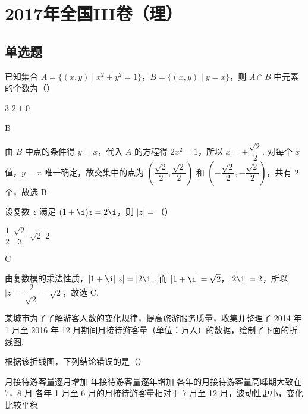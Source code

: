 \chapter{2017年全国III卷（理）}

\section{单选题}

\begin{problem}
已知集合 \(A=\{(x,y)\mid x^2+y^2=1\}\)，\(B=\{(x,y)\mid y=x\}\)，则 \(A\cap B\) 中元素的个数为（\quad）

\choices
    {\(3\)}
    {\(2\)}
    {\(1\)}
    {\(0\)}
\end{problem}

\begin{answer}
B
\end{answer}

\begin{solution}
由 \(B\) 中点的条件得 \(y=x\)，代入 \(A\) 的方程得 \(2x^2=1\)，所以 \(x=\pm\dfrac{\sqrt2}{2}\). 对每个 \(x\) 值，\(y=x\) 唯一确定，故交集中的点为 \(\left(\dfrac{\sqrt2}{2},\dfrac{\sqrt2}{2}\right)\) 和 \(\left(-\dfrac{\sqrt2}{2},-\dfrac{\sqrt2}{2}\right)\)，共有 \(2\) 个，故选 B.
\end{solution}

\begin{problem}
设复数 \(z\) 满足 \((1+\i)z=2\i\)，则 \(\lvert z\rvert=\)（\quad）

\choices
    {\(\dfrac{1}{2}\)}
    {\(\dfrac{\sqrt2}{3}\)}
    {\(\sqrt2\)}
    {\(2\)}
\end{problem}

\begin{answer}
C
\end{answer}

\begin{solution}
由复数模的乘法性质，\(\lvert 1+\i\rvert\lvert z\rvert=\lvert 2\i\rvert\). 而 \(\lvert 1+\i\rvert=\sqrt2\)，\(\lvert 2\i\rvert=2\)，所以 \(\lvert z\rvert=\dfrac{2}{\sqrt2}=\sqrt2\)，故选 C.
\end{solution}

\begin{problem}
某城市为了了解游客人数的变化规律，提高旅游服务质量，收集并整理了 2014 年 1 月至 2016 年 12 月期间月接待游客量（单位：\(\text{万人}\)）的数据，绘制了下面的折线图.


根据该折线图，下列结论错误的是（\quad）

\choices
    {月接待游客量逐月增加}
    {年接待游客量逐年增加}
    {各年的月接待游客量高峰期大致在 \(7\)，\(8\) 月}
    {各年 1 月至 6 月的月接待游客量相对于 7 月至 12 月，波动性更小，变化比较平稳}
\end{problem}

